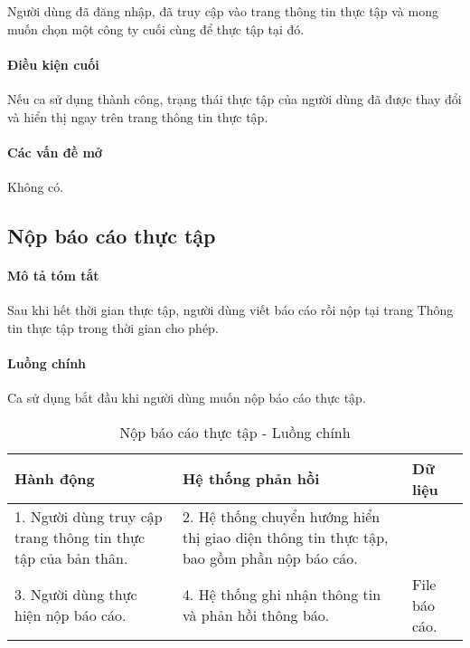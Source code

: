 \documentclass[./../main.tex]{subfiles}
\begin{document}
Người dùng đã đăng nhập, đã truy cập vào trang thông tin thực tập và
mong muốn chọn một công ty cuối cùng để thực tập tại đó.

\paragraph*{Điều kiện cuối}

Nếu ca sử dụng thành công, trạng thái thực tập của người dùng đã được
thay đổi và hiển thị ngay trên trang thông tin thực tập.

\paragraph*{Các vấn đề mở}

Không có.

\subsection{Nộp báo cáo thực tập}

\paragraph*{Mô tả tóm tắt}

Sau khi hết thời gian thực tập, người dùng viết báo cáo rồi nộp tại trang Thông tin thực tập trong thời gian cho phép.

\paragraph*{Luồng chính} Ca sử dụng bắt đầu khi người dùng muốn nộp báo cáo thực tập.

\begin{table}[H]
	\caption{Nộp báo cáo thực tập - Luồng chính}
	\label{tab:upload_report}
	\begin{tabularx}{\textwidth}{|X|X|X|}
		\hline
		\textbf{Hành động}                                                                        &
		\textbf{Hệ thống phản hồi}                                                                &
		\textbf{Dữ liệu}                                                                            \\ \hline
		1. Người dùng truy cập trang thông tin thực tập của bản thân.                             &
		2. Hệ thống chuyển hướng hiển thị giao diện thông tin thực tập, bao gồm phần nộp báo cáo. &
		\\ \hline
		3. Người dùng thực hiện nộp báo cáo.                                                      &
		4. Hệ thống ghi nhận thông tin và phản hồi thông báo.                                     &
		File báo cáo.                                                                               \\ \hline
	\end{tabularx}
\end{table}
\end{document}
